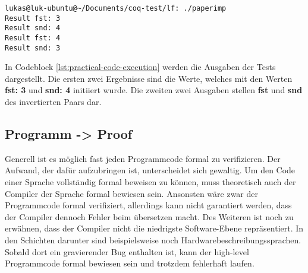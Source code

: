 \begin{lstlisting}[language=coq,firstnumber=1,caption=Ocaml code ausführen,label=lst:practical-code-execution]
lukas@luk-ubuntu@~/Documents/coq-test/lf: ./paperimp
Result fst: 3 
Result snd: 4 
Result fst: 4 
Result snd: 3 
\end{lstlisting}
In Codeblock \ref{lst:practical-code-execution} werden die Ausgaben der Tests dargestellt. Die ersten zwei Ergebnisse sind die Werte, welches mit den Werten \textbf{fst: 3} und \textbf{snd: 4} initiiert wurde. Die zweiten zwei Ausgaben stellen \textbf{fst} und \textbf{snd} des invertierten Paars dar.

\subsection{Programm -> Proof}
Generell ist es möglich fast jeden Programmcode formal zu verifizieren. Der Aufwand, der dafür aufzubringen ist, unterscheidet sich gewaltig. Um den Code einer Sprache vollständig formal beweisen zu können, muss theoretisch auch der Compiler der Sprache formal bewiesen sein. Ansonsten wäre zwar der Programmcode formal verifiziert, allerdings kann nicht garantiert werden, dass der Compiler dennoch Fehler beim übersetzen macht. Des Weiteren ist noch zu erwähnen, dass der Compiler nicht die niedrigste Software-Ebene repräsentiert. In den Schichten darunter sind beispielsweise noch Hardwarebeschreibungssprachen. Sobald dort ein gravierender Bug enthalten ist, kann der high-level Programmcode formal bewiesen sein und trotzdem fehlerhaft laufen.\\
\\
